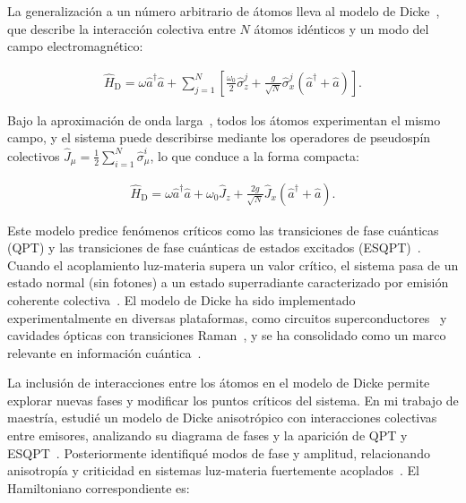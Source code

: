 \documentclass[onecolumn,notitlepage,letterpaper,aps,pra,12pt]{article}
\numberwithin{equation}{section}
\begin{document}
La generalización a un número arbitrario de átomos lleva al modelo de Dicke~\cite{Dicke54}, que describe la interacción colectiva entre $N$ átomos idénticos y un modo del campo electromagnético:

\begin{gather}
    \hat{H}_{\text{D}} = \omega\hat{a}^{\dagger}\hat{a} + \sum_{j=1}^{N}\left[ \frac{\omega_{0}}{2}\hat{\sigma}_{z}^{j} + \frac{g}{\sqrt{N}}\hat{\sigma}_{x}^{j}\left(\hat{a}^{\dagger} + \hat{a}\right) \right].
\end{gather}

Bajo la aproximación de onda larga~\cite{Dicke54}, todos los átomos experimentan el mismo campo, y el sistema puede describirse mediante los operadores de pseudospín colectivos \(\hat{J}_{\mu} = \frac{1}{2}\sum_{i=1}^{N}\hat{\sigma}_{\mu}^{i}\), lo que conduce a la forma compacta:

\begin{gather}\label{Dicke colectivo}
    \hat{H}_{\text{D}} = \omega\hat{a}^{\dagger}\hat{a} + \omega_{0}\hat{J}_{z} + \frac{2g}{\sqrt{N}}\hat{J}_{x}\left( \hat{a}^{\dagger} + \hat{a} \right).
\end{gather}

Este modelo predice fenómenos críticos como las transiciones de fase cuánticas (QPT) y las transiciones de fase cuánticas de estados excitados (ESQPT)~\cite{Hepp73,wang1973,hioe1973,Sachdev99,Larson17}. Cuando el acoplamiento luz-materia supera un valor crítico, el sistema pasa de un estado normal (sin fotones) a un estado superradiante caracterizado por emisión coherente colectiva~\cite{gross1982}. El modelo de Dicke ha sido implementado experimentalmente en diversas plataformas, como circuitos superconductores~\cite{Blais04,Casanova10} y cavidades ópticas con transiciones Raman~\cite{Baden14,Nagy10}, y se ha consolidado como un marco relevante en información cuántica~\cite{Garraway2011,Kirton2018,LeBoite2020}.



La inclusión de interacciones entre los átomos en el modelo de Dicke permite explorar nuevas fases y modificar los puntos críticos del sistema. En mi trabajo de maestría, estudié un modelo de Dicke anisotrópico con interacciones colectivas entre emisores, analizando su diagrama de fases y la aparición de QPT y ESQPT~\cite{Herrera2022}. Posteriormente identifiqué modos de fase y amplitud, relacionando anisotropía y criticidad en sistemas luz-materia fuertemente acoplados~\cite{herrera2024}. El Hamiltoniano correspondiente es:
\end{document}
